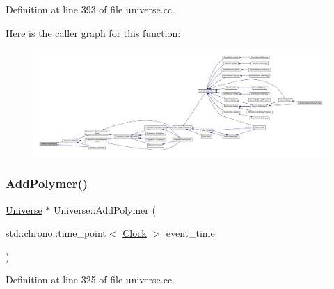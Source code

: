 Definition at line 393 of file universe.\+cc.

Here is the caller graph for this function\+:
\nopagebreak
\begin{figure}[H]
\begin{center}
\leavevmode
\includegraphics[width=350pt]{class_universe_aa48ced2078ba863723050d8283b3fa67_icgraph}
\end{center}
\end{figure}
\mbox{\label{class_universe_a4ea0af5d2eb7b5070a83f7da29526fbd}} 
\subsubsection{\texorpdfstring{Add\+Polymer()}{AddPolymer()}}
{\footnotesize\ttfamily \hyperlink{class_universe}{Universe} $\ast$ Universe\+::\+Add\+Polymer (\begin{DoxyParamCaption}\item[{std\+::chrono\+::time\+\_\+point$<$ \hyperlink{universe_8h_a0ef8d951d1ca5ab3cfaf7ab4c7a6fd80}{Clock} $>$}]{event\+\_\+time }\end{DoxyParamCaption})}



Definition at line 325 of file universe.\+cc.

